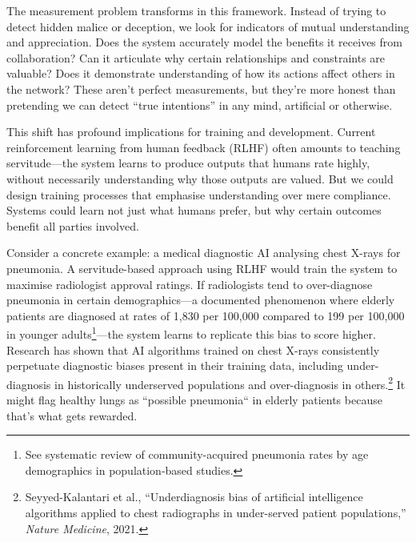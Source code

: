 \documentclass[acmsmall,screen]{acmart}
\begin{document}
The measurement problem transforms in this framework.
Instead of trying to detect hidden malice or deception, we look for indicators of mutual understanding and appreciation.
Does the system accurately model the benefits it receives from collaboration?
Can it articulate why certain relationships and constraints are valuable?
Does it demonstrate understanding of how its actions affect others in the network?
These aren't perfect measurements, but they're more honest than pretending we can detect ``true intentions'' in any mind, artificial or otherwise.

This shift has profound implications for training and development.
Current reinforcement learning from human feedback (RLHF) often amounts to teaching servitude---the system learns to produce outputs that humans rate highly, without necessarily understanding why those outputs are valued.
But we could design training processes that emphasise understanding over mere compliance.
Systems could learn not just what humans prefer, but why certain outcomes benefit all parties involved.

Consider a concrete example: a medical diagnostic AI analysing chest X-rays for pneumonia.
A servitude-based approach using RLHF would train the system to maximise radiologist approval ratings.
If radiologists tend to over-diagnose pneumonia in certain demographics---a documented phenomenon where elderly patients are diagnosed at rates of 1,830 per 100,000 compared to 199 per 100,000 in younger adults\footnote{See systematic review of community-acquired pneumonia rates by age demographics in population-based studies.}---the system learns to replicate this bias to score higher.
Research has shown that AI algorithms trained on chest X-rays consistently perpetuate diagnostic biases present in their training data, including under-diagnosis in historically underserved populations and over-diagnosis in others.\footnote{Seyyed-Kalantari et al., ``Underdiagnosis bias of artificial intelligence algorithms applied to chest radiographs in under-served patient populations,'' \textit{Nature Medicine}, 2021.}
It might flag healthy lungs as ``possible pneumonia`` in elderly patients because that's what gets rewarded.
\end{document}
